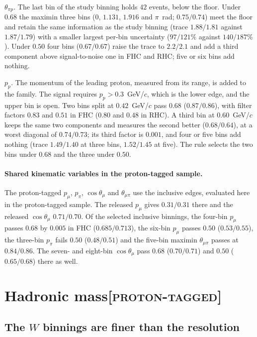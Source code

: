 \documentclass[11pt,a4paper]{article}
\newcommand{\scopetag}[1]{\hfill{\normalfont\small\textsc{[#1]}}}
\begin{document}
\emph{$\theta_{\pi p}$.} The last bin of the study binning holds $42$ events, below the floor.
Under $0.68$ the maximin three bins ($0$, $1.131$, $1.916$ and $\pi$~rad; $0.75/0.74$) meet the
floor and retain the same information as the study binning (trace $1.88/1.81$ against $1.87/1.79$)
with a smaller largest per-bin uncertainty ($97/121\%$ against $140/187\%$). Under $0.50$ four bins
($0.67/0.67$) raise the trace to $2.2/2.1$ and add a third component above signal-to-noise one in
FHC and RHC; five or six bins add nothing.

\emph{$p_p$.} The momentum of the leading proton, measured from its range, is added to the family. The signal
requires $p_p>0.3$~GeV/$c$, which is the lower edge, and the upper bin is open. Two bins split at
$0.42$~GeV/$c$ pass $0.68$ ($0.87/0.86$), with filter factors $0.83$ and $0.51$ in FHC ($0.80$ and
$0.48$ in RHC). A third bin at $0.60$~GeV/$c$ keeps the same two components and measures the second
better ($0.68/0.64$), at a worst diagonal of $0.74/0.73$; its third factor is $0.001$, and four or
five bins add nothing (trace $1.49/1.40$ at three bins, $1.52/1.45$ at five). The rule selects the
two bins under $0.68$ and the three under $0.50$.

\paragraph{Shared kinematic variables in the proton-tagged sample.}
The proton-tagged $p_\mu$, $p_\pi$, $\cos\theta_\mu$ and $\theta_{\mu\pi}$ use the inclusive edges,
evaluated here in the proton-tagged sample. The released $p_\mu$ gives $0.31/0.31$ there and the
released $\cos\theta_\mu$ $0.71/0.70$. Of the selected inclusive binnings, the four-bin $p_\mu$
passes $0.68$ by $0.005$ in FHC ($0.685/0.713$), the six-bin $p_\mu$ passes $0.50$ ($0.53/0.55$),
the three-bin $p_\pi$ fails $0.50$ ($0.48/0.51$) and the five-bin maximin $\theta_{\mu\pi}$ passes
at $0.84/0.86$. The seven- and eight-bin $\cos\theta_\mu$ pass $0.68$ ($0.70/0.71$) and $0.50$
($0.65/0.68$) there as well.

\section[Hadronic mass]{Hadronic mass\scopetag{proton-tagged}}
\label{sec:supp_w}

\subsection{The $W$ binnings are finer than the resolution}
\label{sec:w_binning}
\end{document}
